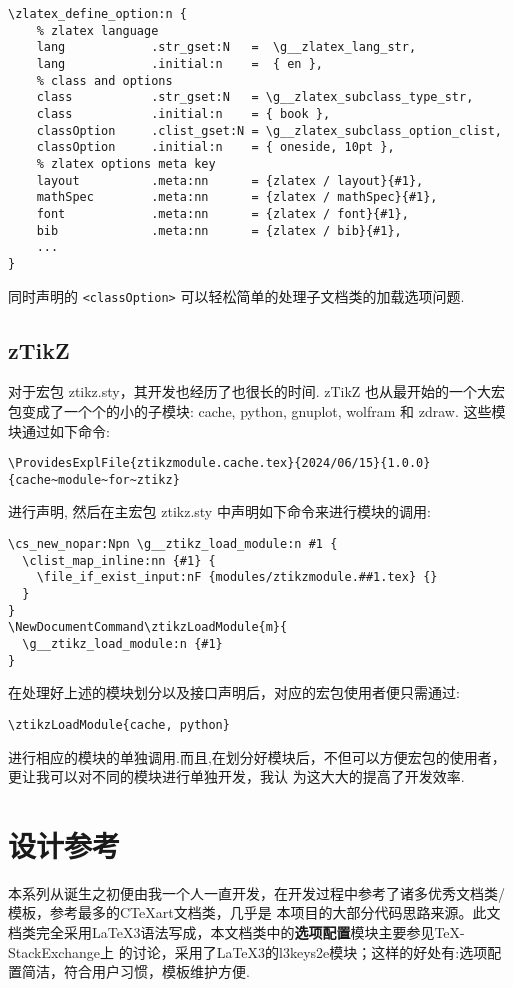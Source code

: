 \documentclass[
  hyper,    
  lang=cn,
  class=book,
  mathSpec={envStyle=leftbar, alias},
  toc={redef}
]{zlatex}
\begin{document}
\begin{verbatim}
\zlatex_define_option:n {
    % zlatex language
    lang            .str_gset:N   =  \g__zlatex_lang_str,
    lang            .initial:n    =  { en },
    % class and options
    class           .str_gset:N   = \g__zlatex_subclass_type_str,
    class           .initial:n    = { book },
    classOption     .clist_gset:N = \g__zlatex_subclass_option_clist,
    classOption     .initial:n    = { oneside, 10pt },
    % zlatex options meta key 
    layout          .meta:nn      = {zlatex / layout}{#1},
    mathSpec        .meta:nn      = {zlatex / mathSpec}{#1},
    font            .meta:nn      = {zlatex / font}{#1},
    bib             .meta:nn      = {zlatex / bib}{#1},
    ...
}
\end{verbatim}

同时声明的 \texttt{<classOption>} 可以轻松简单的处理子文档类的加载选项问题.

\subsection{zTikZ}
对于宏包 ztikz.sty，其开发也经历了也很长的时间. zTikZ 也从最开始的一个大宏包变成了一个个的小的子模块:
cache, python, gnuplot, wolfram 和 zdraw. 这些模块通过如下命令:

\begin{verbatim}
\ProvidesExplFile{ztikzmodule.cache.tex}{2024/06/15}{1.0.0}{cache~module~for~ztikz}
\end{verbatim}

进行声明, 然后在主宏包 ztikz.sty 中声明如下命令来进行模块的调用:
\begin{verbatim}
\cs_new_nopar:Npn \g__ztikz_load_module:n #1 {
  \clist_map_inline:nn {#1} {
    \file_if_exist_input:nF {modules/ztikzmodule.##1.tex} {}
  }
}
\NewDocumentCommand\ztikzLoadModule{m}{
  \g__ztikz_load_module:n {#1}
}
\end{verbatim}

在处理好上述的模块划分以及接口声明后，对应的宏包使用者便只需通过:
\begin{verbatim}
\ztikzLoadModule{cache, python}
\end{verbatim}

进行相应的模块的单独调用.而且,在划分好模块后，不但可以方便宏包的使用者，更让我可以对不同的模块进行单独开发，我认
为这大大的提高了开发效率.

\section{设计参考}
本系列从诞生之初便由我一个人一直开发，在开发过程中参考了诸多优秀文档类/模板，参考最多的{C\TeX{}art}文档类，几乎是
本项目的大部分代码思路来源。此文档类完全采用\LaTeX3语法写成，本文档类中的\textbf{选项配置}模块主要参见\TeX-StackExchange上
的讨论，采用了\LaTeX3的l3keys2e模块；这样的好处有:选项配置简洁，符合用户习惯，模板维护方便.
\end{document}
